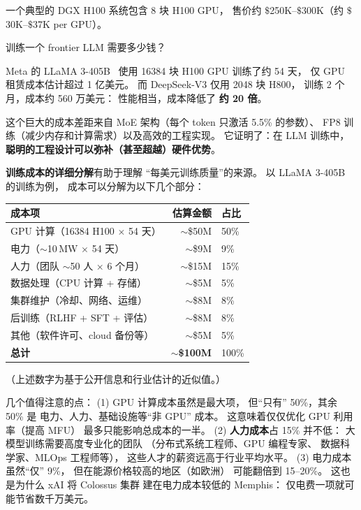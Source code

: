 一个典型的 DGX H100 系统包含 8 块 H100 GPU，
售价约 $\$$250K--$\$$300K（约 $\$$30K--$\$$37K per GPU）。

训练一个 frontier LLM 需要多少钱？

Meta 的 LLaMA 3-405B~\cite{dubey2024llama3}
使用 16384 块 H100 GPU 训练了约 54 天，
仅 GPU 租赁成本估计超过 1 亿美元。
而 DeepSeek-V3 仅用 2048 块 H800，
训练 2 个月，成本约 560 万美元：
性能相当，成本降低了 \textbf{约 20 倍}。

这个巨大的成本差距来自 MoE 架构（每个 token 只激活 5.5\% 的参数）、
FP8 训练（减少内存和计算需求）以及高效的工程实现。
它证明了：在 LLM 训练中，
\textbf{聪明的工程设计可以弥补（甚至超越）硬件优势}。

\textbf{训练成本的详细分解}有助于理解
“每美元训练质量”的来源。
以 LLaMA 3-405B 的训练为例，
成本可以分解为以下几个部分：

\begin{center}\small
\renewcommand{\arraystretch}{1.3}
\begin{tabular}{lrl}
\toprule
\rowcolor{figLightGray}
\textbf{成本项} & \textbf{估算金额} & \textbf{占比} \\
\midrule
GPU 计算（16384 H100 $\times$ 54 天） & $\sim$\$50M & 50\% \\
电力（$\sim$10\,MW $\times$ 54 天） & $\sim$\$9M & 9\% \\
人力（团队 $\sim$50 人 $\times$ 6 个月） & $\sim$\$15M & 15\% \\
数据处理（CPU 计算 + 存储） & $\sim$\$5M & 5\% \\
集群维护（冷却、网络、运维） & $\sim$\$8M & 8\% \\
后训练（RLHF + SFT + 评估） & $\sim$\$8M & 8\% \\
其他（软件许可、cloud 备份等） & $\sim$\$5M & 5\% \\
\midrule
\textbf{总计} & $\sim$\textbf{\$100M} & 100\% \\
\bottomrule
\end{tabular}
\end{center}

（上述数字为基于公开信息和行业估计的近似值。）

几个值得注意的点：
(1) GPU 计算成本虽然是最大项，
但“只有” 50\%，其余 50\% 是
电力、人力、基础设施等“非 GPU” 成本。
这意味着仅仅优化 GPU 利用率（提高 MFU）
最多只能影响总成本的一半。
(2) \textbf{人力成本}占 15\% 并不低：
大模型训练需要高度专业化的团队
（分布式系统工程师、GPU 编程专家、
数据科学家、MLOps 工程师等），
这些人才的薪资远高于行业平均水平。
(3) 电力成本虽然“仅” 9\%，
但在能源价格较高的地区（如欧洲）
可能翻倍到 15--20\%。
这也是为什么 xAI 将 Colossus 集群
建在电力成本较低的 Memphis：
仅电费一项就可能节省数千万美元。

